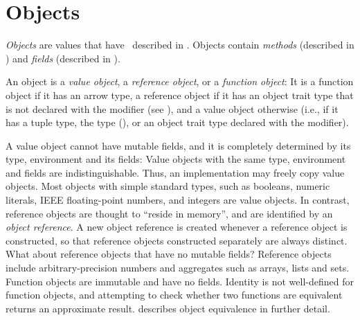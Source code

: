 %
%
%
%

\chapter{Objects}


\emph{Objects} are values that have \objecttypes\ described in
.
Objects contain \emph{methods} (described in ) and
\emph{fields} (described in ).

An object is a \emph{value object}, a \emph{reference object},
or a \emph{function object}:
It is a function object if it has an arrow type,
a reference object if it has an object trait type
that is not declared with the  modifier
(see ),
and a value object otherwise
(i.e., if it has a tuple type, the type (),
or an object trait type declared
with the  modifier).

A value object cannot have mutable fields,
and it is completely determined by its type,
environment and its fields:
Value objects with the same type, environment and fields
are indistinguishable.
Thus, an implementation may freely copy value objects.
Most objects with simple standard types,
such as booleans,
numeric literals,
IEEE floating-point numbers,
and integers are value objects.
%
In contrast,
reference objects are thought to ``reside in memory'',
and are identified by an \emph{object reference}.
A new object reference is created
whenever a reference object is constructed,
so that reference objects constructed separately are always distinct.
What about reference objects that have no mutable fields?
Reference objects include
arbitrary-precision numbers
and aggregates such as arrays, lists and sets.
%
Function objects are immutable and have no fields.  Identity is not
well-defined for function objects, and attempting to check whether two
functions are equivalent returns an approximate result.
 describes object equivalence in further detail.




